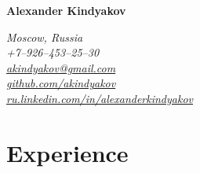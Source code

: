 \documentclass[a4paper, 10pt]{article}
\begin{document}
{\LARGE\textbf{Alexander Kindyakov}}

\begin{flushright}
    {\itshape
        Moscow, Russia \\
        +7--926--453--25--30 \\
        \href{mailto:akindyakov@gmail.com}{akindyakov@gmail.com} \\
        \href{https://github.com/akindyakov}{github.com/akindyakov} \\
        \href{http://ru.linkedin.com/in/alexanderkindyakov}{ru.linkedin.com/in/alexanderkindyakov} \\
    }
\end{flushright}


\section{Experience}
\end{document}
